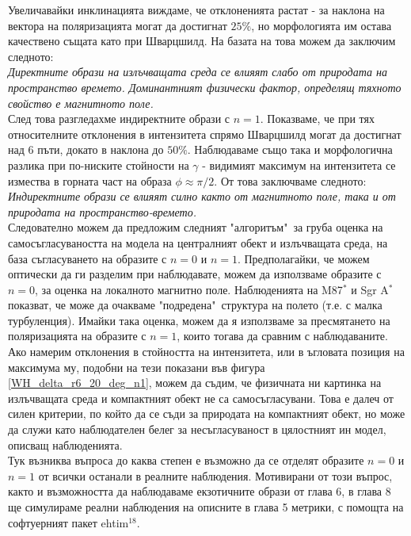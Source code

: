 Увеличавайки инклинацията виждаме, че отклоненията растат - за наклона на вектора на поляризацията могат да достигнат $25\%$, но морфологията им остава качествено същата като при Шварцшилд. На базата на това можем да заключим следното:\\

\emph{Директните образи на излъчващата среда се влияят слабо от природата на пространство времето. Доминантният физически фактор, определящ тяхното свойство е магнитното поле.}\\

След това разгледахме индиректните образи с $n = 1$. Показваме, че при тях относителните отклонения в интензитета спрямо Шварцшилд могат да достигнат над 6 пъти, докато в наклона до $50\%$. Наблюдаваме също така и морфологична разлика при по-ниските стойности на $\gamma$ - видимият максимум на интензитета се измества в горната част на образа $\phi\approx\pi / 2$. От това заключваме следното:\\

\emph{Индиректните образи се влияят силно както от магнитното поле, така и от природата на пространство-времето.}\\

Следователно можем да предложим следният "алгоритъм"$\,$ за груба оценка на самосъгласуваността на модела на централният обект и излъчващата среда, на база съгласуването на образите с $n = 0$ и $n = 1$. Предполагайки, че можем оптически да ги разделим при наблюдавате, можем да използваме образите с $n = 0$, за оценка на локалното магнитно поле. Наблюденията на M87$^*$ и Sgr A$^*$ показват, че може да очакваме "подредена"$\,$ структура на полето (т.е. с малка турбуленция). Имайки така оценка, можем да я използваме за пресмятането на поляризацията на образите с $n = 1$, които тогава да сравним с наблюдаваните. Ако намерим отклонения в стойността на интензитета, или в ъгловата позиция на максимума му, подобни на тези показани във фигура \ref{WH_delta_r6_20_deg_n1}, можем да съдим, че физичната ни картинка на излъчващата среда и компактният обект не са самосъгласувани. Това е далеч от силен критерии, по който да се съди за природата на компактният обект, но може да служи като наблюдателен белег за несъгласуваност в цялостният ин модел, описващ наблюденията.\\

Тук възниква въпроса до каква степен е възможно да се отделят образите $n = 0$ и $n = 1$ от всички останали в реалните наблюдения. Мотивирани от този въпрос, както и възможността да наблюдаваме екзотичните образи от глава 6, в глава 8 ще симулираме реални наблюдения на описните в глава 5 метрики, с помощта на софтуерният пакет ehtim$^{18}$.

